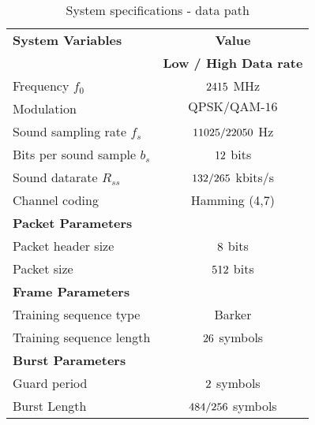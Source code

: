 \begin{table}[htbp]
  \centering
  \caption{System specifications - data path}
    \begin{tabular}{lc}
    \rowcolor[rgb]{ 0,  0,  0} \textcolor[rgb]{ 1,  1,  1}{\textbf{System Variables}}	& \textcolor[rgb]{ 1,  1,  1}{\textbf{Value}} 		\\
    \rowcolor[rgb]{ 0,  0,  0} \textcolor[rgb]{ 1,  1,  1}{} & \textcolor[rgb]{ 1,  1,  1}{\textbf{Low / High Data rate}} 				\\
    	Frequency $f_0$ 						& $2415$ MHz 									\\
    	Modulation 							& $\text{QPSK} / \text{QAM-16}$								\\
    	Sound sampling rate $f_s$  				& $11025 / 22050$ Hz			\\
    	Bits per sound sample $b_s$ 				& $12$ bits									\\
    	Sound datarate $R_{ss}$ 					& $\sourceDataRateQPSK / \sourceDataRateQAM$ kbits/s			\\
    	Channel coding 						& Hamming (4,7) 											\\

    \rowcolor[rgb]{ 0,  0,  0} \textcolor[rgb]{ 1,  1,  1}{\textbf{Packet Parameters}} & \textcolor[rgb]{ 1,  1,  1}{} 				\\
	Packet header size      					& $8 $  bits										\\
    	Packet size   							& $512$  bits										\\
    
    \rowcolor[rgb]{ 0,  0,  0} \textcolor[rgb]{ 1,  1,  1}{\textbf{Frame Parameters}} & \textcolor[rgb]{ 1,  1,  1}{} 				\\
    	Training sequence type 					& Barker										 			\\
    	Training sequence length					& $26$ symbols 					 				\\
        
    \rowcolor[rgb]{ 0,  0,  0} \textcolor[rgb]{ 1,  1,  1}{\textbf{Burst Parameters}} & \textcolor[rgb]{ 1,  1,  1}{} 					\\
    	Guard period 							& $2$ symbols									\\
    	Burst Length							& $484 / 256$ symbols	\\
    	

\end{tabular}
\end{table}
